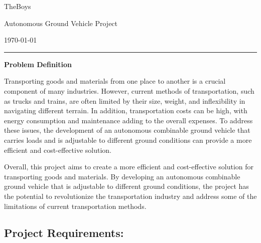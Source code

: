 \documentclass[12pt]{article}
\begin{document}
\thispagestyle{empty}
\vspace*{-1.5cm} \medskip 
\begin{minipage}{0.295\textwidth} 
\raggedright
\normalsize
TheBoys \hfill\\ 
\end{minipage}
\begin{minipage}{0.35\textwidth} 
\centering 
\large 
Autonomous Ground Vehicle Project\\ 
\normalsize  
\end{minipage}
\begin{minipage}{0.295\textwidth} 
\raggedleft
{\normalsize{\today}}\\ %
\end{minipage}
\medskip
\bigskip

\rule{\linewidth}{1pt}

\begin{center}
\Large
\textbf{Problem Definition}
\end{center}


\smallskip 

Transporting goods and materials from one place to another is a crucial component of many industries. However, current methods of transportation, such as trucks and trains, are often limited by their size, weight, and inflexibility in navigating different terrain. In addition, transportation costs can be high, with energy consumption and maintenance adding to the overall expenses. To address these issues, the development of an autonomous combinable ground vehicle that carries loads and is adjustable to different ground conditions can provide a more efficient and cost-effective solution. 

Overall, this project aims to create a more efficient and cost-effective solution for transporting goods and materials. By developing an autonomous combinable ground vehicle that is adjustable to different ground conditions, the project has the potential to revolutionize the transportation industry and address some of the limitations of current transportation methods.

\subsection*{Project Requirements:}
\end{document}
